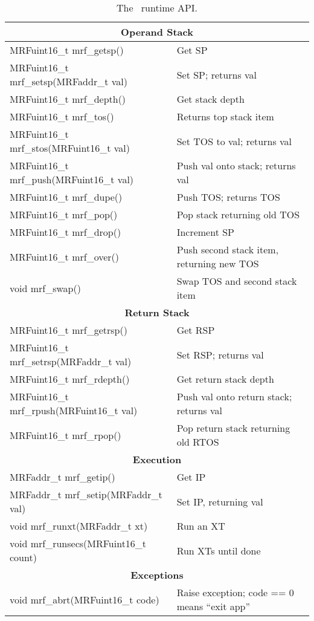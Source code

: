 \documentclass{article}
\begin{document}
\begin{table}
\begin{center}
\begin{tabular}{|l|l|}
\multicolumn{2}{c}{\textbf{Operand Stack}} \\ \hline
MRFuint16\_t mrf\_getsp() & Get SP \\ \hline
MRFuint16\_t mrf\_setsp(MRFaddr\_t val) & Set SP; returns val \\ \hline
MRFuint16\_t mrf\_depth() & Get stack depth \\ \hline
MRFuint16\_t mrf\_tos() & Returns top stack item \\ \hline
MRFuint16\_t mrf\_stos(MRFuint16\_t val) &
  Set TOS to val; returns val \\ \hline
MRFuint16\_t mrf\_push(MRFuint16\_t val) &
  Push val onto stack; returns val \\ \hline
MRFuint16\_t mrf\_dupe() & Push TOS; returns TOS \\ \hline
MRFuint16\_t mrf\_pop() & Pop stack returning old TOS \\ \hline
MRFuint16\_t mrf\_drop() & Increment SP \\ \hline
MRFuint16\_t mrf\_over() &
  Push second stack item, returning new TOS \\ \hline
void mrf\_swap() & Swap TOS and second stack item \\ \hline

\multicolumn{2}{c}{\textbf{Return Stack}} \\ \hline
MRFuint16\_t mrf\_getrsp() & Get RSP \\ \hline
MRFuint16\_t mrf\_setrsp(MRFaddr\_t val) & Set RSP; returns val \\ \hline
MRFuint16\_t mrf\_rdepth() & Get return stack depth \\ \hline
MRFuint16\_t mrf\_rpush(MRFuint16\_t val) &
  Push val onto return stack; returns val \\ \hline
MRFuint16\_t mrf\_rpop() & Pop return stack returning old RTOS \\ \hline

\multicolumn{2}{c}{\textbf{Execution}} \\ \hline
MRFaddr\_t mrf\_getip() & Get IP \\ \hline
MRFaddr\_t mrf\_setip(MRFaddr\_t val) & Set IP, returning val \\ \hline
void mrf\_runxt(MRFaddr\_t xt) & Run an XT \\ \hline
void mrf\_runsecs(MRFuint16\_t count) & Run XTs until done \\ \hline

\multicolumn{2}{c}{\textbf{Exceptions}} \\ \hline
void mrf\_abrt(MRFuint16\_t code) &
  Raise exception; code == 0 means ``exit app'' \\ \hline

\end{tabular}
\end{center}
\caption{The \M\ runtime API.}
\label{t:api}
\end{table}
\end{document}
